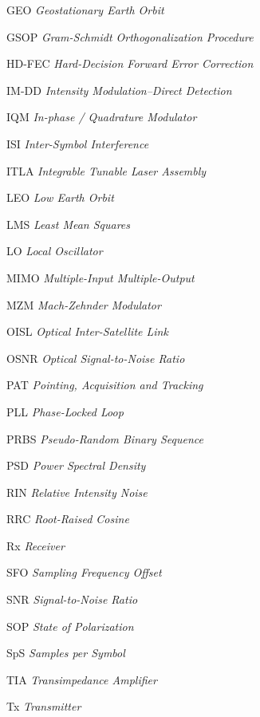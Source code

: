 \begin{listaacronimos}
\item[GEO]     \textit{Geostationary Earth Orbit}
\item[GSOP]    \textit{Gram-Schmidt Orthogonalization Procedure}
\item[HD-FEC]  \textit{Hard-Decision Forward Error Correction}
\item[IM-DD]   \textit{Intensity Modulation--Direct Detection}
\item[IQM]     \textit{In-phase / Quadrature Modulator}
\item[ISI]     \textit{Inter-Symbol Interference}
\item[ITLA]    \textit{Integrable Tunable Laser Assembly}
\item[LEO]     \textit{Low Earth Orbit}
\item[LMS]     \textit{Least Mean Squares}
\item[LO]      \textit{Local Oscillator}
\item[MIMO]    \textit{Multiple-Input Multiple-Output}
\item[MZM]     \textit{Mach-Zehnder Modulator}
\item[OISL]    \textit{Optical Inter-Satellite Link}
\item[OSNR]    \textit{Optical Signal-to-Noise Ratio}
\item[PAT]     \textit{Pointing, Acquisition and Tracking}
\item[PLL]     \textit{Phase-Locked Loop}
\item[PRBS]    \textit{Pseudo-Random Binary Sequence}
\item[PSD]     \textit{Power Spectral Density}
\item[RIN]     \textit{Relative Intensity Noise}
\item[RRC]     \textit{Root-Raised Cosine}
\item[Rx]      \textit{Receiver}
\item[SFO]     \textit{Sampling Frequency Offset}
\item[SNR]     \textit{Signal-to-Noise Ratio}
\item[SOP]     \textit{State of Polarization}
\item[SpS]     \textit{Samples per Symbol}
\item[TIA]     \textit{Transimpedance Amplifier}
\item[Tx]      \textit{Transmitter}
\end{listaacronimos}

\cleardoublepage

